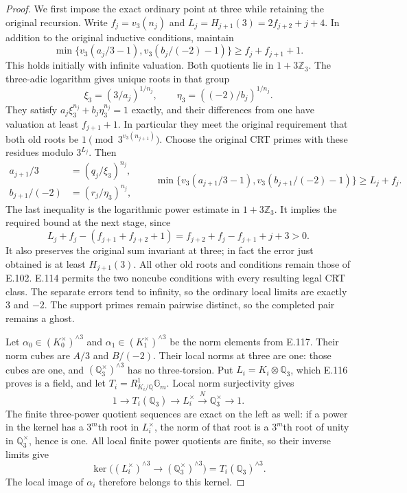 \begin{proof}
We first impose the exact ordinary point at three while retaining
the original recursion. Write $f_j=v_3(n_j)$ and
$L_j=H_{j+1}(3)=2f_{j+2}+j+4$. In addition to the original
inductive conditions, maintain
\[
 \min\{v_3(a_j/3-1),v_3(b_j/(-2)-1)\}
       \ge f_j+f_{j+1}+1.
\]
This holds initially with infinite valuation. Both quotients lie
in $1+3\mathbb Z_3$. The three-adic logarithm gives unique roots
in that group
\[
 \xi_3=(3/a_j)^{1/n_j},\qquad
 \eta_3=((-2)/b_j)^{1/n_j}.
\]
They satisfy $a_j\xi_3^{n_j}+b_j\eta_3^{n_j}=1$ exactly, and
their differences from one have valuation at least $f_{j+1}+1$.
In particular they meet the original requirement that both old
roots be $1\pmod{3^{v_3(n_{j+1})}}$.
Choose the original CRT primes with these residues modulo $3^{L_j}$.
Then
\[
 \begin{split}
 a_{j+1}/3&=(q_j/\xi_3)^{n_j},\\
 b_{j+1}/(-2)&=(r_j/\eta_3)^{n_j},
 \end{split}
\qquad
 \min\{v_3(a_{j+1}/3-1),v_3(b_{j+1}/(-2)-1)\}
       \ge L_j+f_j.
\]
The last inequality is the logarithmic power estimate in
$1+3\mathbb Z_3$. It implies the required bound at the next
stage, since
\[
 L_j+f_j-(f_{j+1}+f_{j+2}+1)
      =f_{j+2}+f_j-f_{j+1}+j+3>0.
\]
It also preserves the original sum invariant at three; in fact
the error just obtained is at least $H_{j+1}(3)$. All other old
roots and conditions remain those of E.102. E.114 permits the
two noncube conditions with every resulting legal CRT class.
The separate errors tend to infinity, so the ordinary local limits
are exactly $3$ and $-2$. The support primes remain pairwise distinct,
so the completed pair remains a ghost.

Let $\alpha_0\in(K_0^\times)^{\wedge3}$ and
$\alpha_1\in(K_1^\times)^{\wedge3}$ be the norm elements from
E.117. Their norm cubes are $A/3$ and $B/(-2)$. Their local norms
at three are one: those cubes are one, and
$(\mathbb Q_3^\times)^{\wedge3}$ has no three-torsion.
Put $L_i=K_i\otimes\mathbb Q_3$, which E.116 proves is a field,
and let $T_i=R^1_{K_i/\mathbb Q}\mathbb G_m$.
Local norm surjectivity gives
\[
 1\longrightarrow T_i(\mathbb Q_3)
 \longrightarrow L_i^\times
 \xrightarrow{N}\mathbb Q_3^\times\longrightarrow1.
\]
The finite three-power quotient sequences are exact on the left
as well: if a power in the kernel has a $3^m$th root in
$L_i^\times$, the norm of that root is a $3^m$th root of unity
in $\mathbb Q_3^\times$, hence is one. All local finite power
quotients are finite, so their inverse limits give
\[
 \ker\bigl((L_i^\times)^{\wedge3}
          \longrightarrow(\mathbb Q_3^\times)^{\wedge3}\bigr)
           =T_i(\mathbb Q_3)^{\wedge3}.
\]
The local image of $\alpha_i$ therefore belongs to this kernel.


\end{proof}
